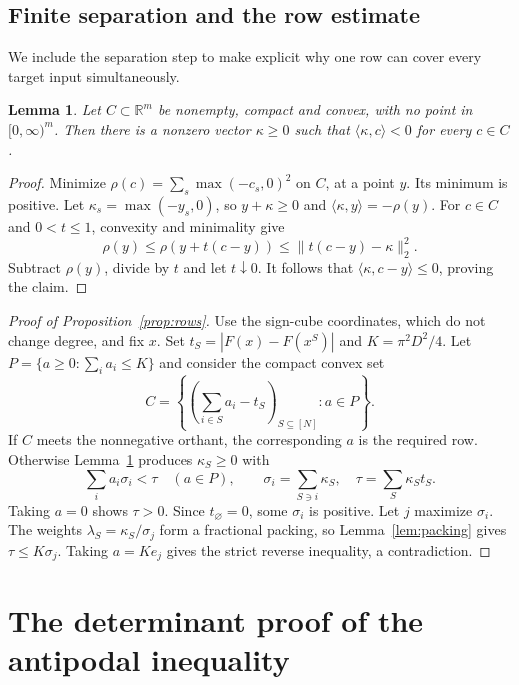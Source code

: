\documentclass[11pt,reqno]{amsart}
\newtheorem{lemma}[theorem]{Lemma}
\theoremstyle{definition}
\theoremstyle{remark}
\newcommand{\R}{\mathbb R}
\numberwithin{equation}{section}
\begin{document}
\subsection{Finite separation and the row estimate}

We include the separation step to make explicit why one row can cover
every target input simultaneously.

\begin{lemma}\label{lem:finite-separation}
Let $C\subset\R^m$ be nonempty, compact and convex, with no point in
$[0,\infty)^m$. Then there is a nonzero vector $\kappa\ge0$ such that
$\langle\kappa,c\rangle<0$ for every $c\in C$.
\end{lemma}

\begin{proof}
Minimize $\rho(c)=\sum_s\max(-c_s,0)^2$ on $C$, at a point $y$.
Its minimum is positive. Let $\kappa_s=\max(-y_s,0)$, so
$y+\kappa\ge0$ and $\langle\kappa,y\rangle=-\rho(y)$.
For $c\in C$ and $0<t\le1$, convexity and minimality give
\[
 \rho(y)\le\rho(y+t(c-y))
 \le\|t(c-y)-\kappa\|_2^2.
\]
Subtract $\rho(y)$, divide by $t$ and let $t\downarrow0$.
It follows that $\langle\kappa,c-y\rangle\le0$, proving the claim.
\end{proof}

\begin{proof}[Proof of Proposition~\ref{prop:rows}]
Use the sign-cube coordinates, which do not change degree, and fix $x$.
Set $t_S=|F(x)-F(x^S)|$ and $K=\pi^2D^2/4$.
Let $P=\{a\ge0:\sum_i a_i\le K\}$ and consider the compact convex set
\[
 C=\left\{\left(\sum_{i\in S}a_i-t_S\right)_{S\subseteq[N]}:a\in P\right\}.
\]
If $C$ meets the nonnegative orthant, the corresponding $a$ is the
required row. Otherwise Lemma~\ref{lem:finite-separation} produces
$\kappa_S\ge0$ with
\[
 \sum_i a_i\sigma_i<\tau\quad(a\in P),\qquad
 \sigma_i=\sum_{S\ni i}\kappa_S,\quad \tau=\sum_S\kappa_St_S.
\]
Taking $a=0$ shows $\tau>0$. Since $t_\varnothing=0$, some
$\sigma_i$ is positive. Let $j$ maximize $\sigma_i$.
The weights $\lambda_S=\kappa_S/\sigma_j$ form a fractional packing,
so Lemma~\ref{lem:packing} gives $\tau\le K\sigma_j$.
Taking $a=Ke_j$ gives the strict reverse inequality, a contradiction.
\end{proof}

\section{The determinant proof of the antipodal inequality}\label{app:determinant}
\end{document}

